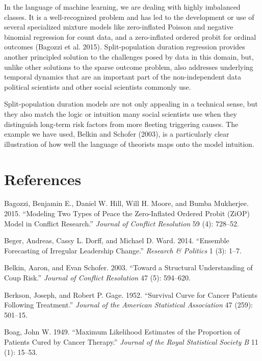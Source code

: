 \documentclass[article]{jss}
\begin{document}
In the language of machine learning, we are dealing with highly
imbalanced classes. It is a well-recognized problem and has led to the
development or use of several specialized mixture models like
zero-inflated Poisson and negative binomial regression for count data,
and a zero-inflated ordered probit for ordinal outcomes (Bagozzi et al.
2015). Split-population duration regression provides another principled
solution to the challenges posed by data in this domain, but, unlike
other solutions to the sparse outcome problem, also addresses underlying
temporal dynamics that are an important part of the non-independent data
political scientists and other social scientists commonly use.

Split-population duration models are not only appealing in a technical
sense, but they also match the logic or intuition many social scientists
use when they distinguish long-term risk factors from more fleeting
triggering causes. The example we have used, Belkin and Schofer (2003),
is a particularly clear illustration of how well the language of
theorists maps onto the model intuition.

\section*{References}\label{references}

\hypertarget{refs}{}
\hypertarget{ref-bagozzi2015modeling}{}
Bagozzi, Benjamin E., Daniel W. Hill, Will H. Moore, and Bumba
Mukherjee. 2015. ``Modeling Two Types of Peace the Zero-Inflated Ordered
Probit (ZiOP) Model in Conflict Research.'' \emph{Journal of Conflict
Resolution} 59 (4): 728--52.

\hypertarget{ref-beger2014ensemble}{}
Beger, Andreas, Cassy L. Dorff, and Michael D. Ward. 2014. ``Ensemble
Forecasting of Irregular Leadership Change.'' \emph{Research \&
Politics} 1 (3): 1--7.

\hypertarget{ref-belkin2003toward}{}
Belkin, Aaron, and Evan Schofer. 2003. ``Toward a Structural
Understanding of Coup Risk.'' \emph{Journal of Conflict Resolution} 47
(5): 594--620.

\hypertarget{ref-berkson1952survival}{}
Berkson, Joseph, and Robert P. Gage. 1952. ``Survival Curve for Cancer
Patients Following Treatment.'' \emph{Journal of the American
Statistical Association} 47 (259): 501--15.

\hypertarget{ref-boag1949maximum}{}
Boag, John W. 1949. ``Maximum Likelihood Estimates of the Proportion of
Patients Cured by Cancer Therapy.'' \emph{Journal of the Royal
Statistical Society B} 11 (1): 15--53.
\end{document}
